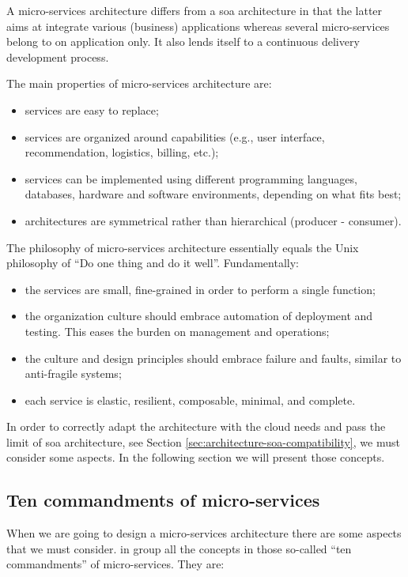 A micro-services architecture differs from a \ac{soa} architecture in that the latter aims at integrate
various (business) applications whereas several micro-services belong to on application only. It also
lends itself to a continuous delivery development process.

The main properties of micro-services architecture are:

\begin{itemize}
	\item{services are easy to replace;}
	\item{services are organized around capabilities (e.g., user interface, recommendation,
		logistics, billing, etc.);}
	\item{services can be implemented using different programming languages, databases, hardware and
		software environments, depending on what fits best;}
	\item{architectures are symmetrical rather than hierarchical (producer - consumer).}
\end{itemize}

The philosophy of micro-services architecture essentially equals the Unix philosophy of ``Do one thing and do
it well''. Fundamentally:

\begin{itemize}
	\item{the services are small, fine-grained in order to perform a single function;}
	\item{the organization culture should embrace automation of deployment and testing. This eases the burden
		on management and operations;}
	\item{the culture and design principles should embrace failure and faults, similar to anti-fragile systems;}
	\item{each service is elastic, resilient, composable, minimal, and complete.}
\end{itemize}

In order to correctly adapt the architecture with the cloud needs and pass the limit of \ac{soa} architecture,
see Section \ref{sec:architecture-soa-compatibility}, we must consider some aspects. In the following
section we will present those concepts.

\subsection{Ten commandments of micro-services}
\label{sec:architecture-proposal-microservices-commandments}
When we are going to design a micro-services architecture there are some aspects that we must consider.
\citeauthor{microservicesCommandments} in \cite{microservicesCommandments} group all the concepts in those
so-called ``ten commandments'' of micro-services. They are:

